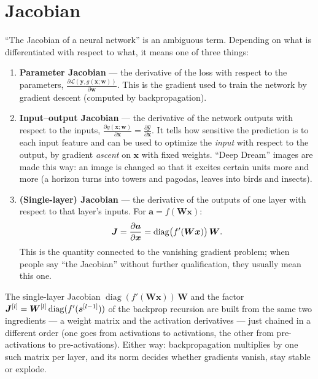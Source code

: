\documentclass[11pt, oneside]{book}
\newcommand{\pd}[2]{\frac{\partial #1}{\partial #2}}
\newcommand{\diag}{\operatorname{diag}}
\newcommand{\loss}{\mathcal{L}}          %
\newcommand{\params}{\boldsymbol{\theta}}   %
\newcommand{\bx}{\bm{x}}        \newcommand{\by}{\bm{y}}
\newcommand{\bw}{\bm{w}}        \newcommand{\bW}{\bm{W}}
\newcommand{\ba}{\bm{a}}        \newcommand{\bs}{\bm{s}}
\newcommand{\byhat}{\hat{\bm{y}}}
\newcommand{\lay}[1]{^{[#1]}}            %
\let\originalsection\section
\renewcommand{\section}{\Needspace{7\baselineskip}\originalsection}
\begin{document}
\section{Jacobian}
\label{sec:jacobian}

``The Jacobian of a neural network'' is an ambiguous term. Depending on what
is differentiated with respect to what, it means one of three things:

\begin{defbox}[title={Three Jacobians of a neural network}]
\begin{enumerate}
  \item \textbf{Parameter Jacobian} --- the derivative of the loss with
    respect to the parameters,
    $\displaystyle \pd{\loss(\by, g(\bx; \bw))}{\bw}$.
    This is the gradient used to train the network by gradient descent
    (computed by backpropagation).
  \item \textbf{Input--output Jacobian} --- the derivative of the network
    outputs with respect to the inputs,
    $\displaystyle \pd{g(\bx; \bw)}{\bx} = \pd{\byhat}{\bx}$.
    It tells how sensitive the prediction is to each input feature and can
    be used to optimize the \emph{input} with respect to the output, by
    gradient \emph{ascent} on $\bx$ with fixed weights. ``Deep Dream''
    images are made this way: an image is changed so that it excites
    certain units more and more (a horizon turns into towers and pagodas,
    leaves into birds and insects).
  \item \textbf{(Single-layer) Jacobian} --- the derivative of the outputs of
    one layer with respect to that layer's inputs. For $\ba = f(\bW\bx)$:
    \[
      \bJ = \pd{\ba}{\bx} = \diag\bigl(f'(\bW\bx)\bigr)\,\bW .
    \]
    This is the quantity connected to the vanishing gradient problem; when
    people say ``the Jacobian'' without further qualification, they usually
    mean this one.
\end{enumerate}
\end{defbox}

\begin{intbox}
The single-layer Jacobian $\diag(f'(\bW\bx))\,\bW$ and the factor
$\bJ\lay{l} = \bW\lay{l}\diag(f'(\bs\lay{l-1}))$ of the backprop recursion
are built from the same two ingredients --- a weight matrix and the
activation derivatives --- just chained in a different order (one goes from
activations to activations, the other from pre-activations to
pre-activations). Either way: backpropagation multiplies by one such matrix
per layer, and its norm decides whether gradients vanish, stay stable or
explode.
\end{intbox}
\end{document}
